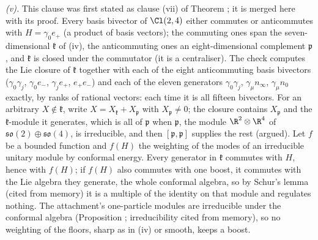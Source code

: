 \emph{(v).} This clause was first stated as clause (vii) of Theorem ; it is merged here with its proof. Every basis bivector of $\Cl(2,4)$ either commutes or anticommutes with $H = \gamma_0e_+$ (a product of basis vectors); the commuting ones span the seven-dimensional $\mathfrak{k}$ of (iv), the anticommuting ones an eight-dimensional complement $\mathfrak{p}$, and $\mathfrak{k}$ is closed under the commutator (it is a centraliser). The check computes the Lie closure of $\mathfrak{k}$ together with each of the eight anticommuting basis bivectors ($\gamma_0\gamma_j$, $\gamma_0e_-$, $\gamma_je_+$, $e_+e_-$) and each of the eleven generators $\gamma_0\gamma_j$, $\gamma_\mu n_\infty$, $\gamma_\mu n_0$ exactly, by ranks of rational vectors: each time it is all fifteen bivectors. For an arbitrary $X \notin \mathfrak{k}$, write $X = X_{\mathfrak{k}} + X_{\mathfrak{p}}$ with $X_{\mathfrak{p}} \neq 0$; the closure contains $X_{\mathfrak{p}}$ and the $\mathfrak{k}$-module it generates, which is all of $\mathfrak{p}$ when $\mathfrak{p}$, the module $\R^{2}\otimes\R^{4}$ of $\mathfrak{so}(2)\oplus\mathfrak{so}(4)$, is irreducible, and then $[\mathfrak{p}, \mathfrak{p}]$ supplies the rest (argued). Let $f$ be a bounded function and $f(H)$ the weighting of the modes of an irreducible unitary module by conformal energy. Every generator in $\mathfrak{k}$ commutes with $H$, hence with $f(H)$; if $f(H)$ also commutes with one boost, it commutes with the Lie algebra they generate, the whole conformal algebra, so by Schur's lemma (cited from memory) it is a multiple of the identity on that module and regulates nothing. The attachment's one-particle modules are irreducible under the conformal algebra (Proposition ; irreducibility cited from memory), so no weighting of the floors, sharp as in (iv) or smooth, keeps a boost.

